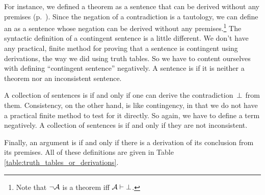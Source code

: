 For instance, we defined a theorem as a sentence that can be derived
without any premises (p.~\pageref{def:syntactic_tautology_in_sl}).
Since the negation of a contradiction is a tautology, we can define an
\label{def:syntactic_contradiction_in_sl} as a sentence whose negation
can be derived without any premises.\footnote{Note that $\lnot
\mathcal{A}$ is a theorem iff $\mathcal{A} \vdash \bot$.} The syntactic
definition of a contingent sentence is a little different. We don't
have any practical, finite method for proving that a sentence is
contingent using derivations, the way we did using truth tables. So we
have to content ourselves with defining ``contingent sentence''
negatively. A sentence is  \label{def:syntactically_contingent_in_sl} if it is neither a
theorem nor an inconsistent sentence.
 

A collection of sentences is  \label{def:syntactically_inconsistent_ in_sl} if and only if one can derive the contradiction~$\bot$ from them. Consistency, on the other hand, is like contingency, in that we do not have a practical finite method to test for it directly. So again, we have to define a term negatively. A collection of sentences is  \label{def:syntactically consistent in SL} if and only if they are not inconsistent.
    

Finally, an argument is  \label{def:syntactically_valid_in_SL} if and only if there is a derivation of its conclusion from its premises. All of these definitions are given in Table \ref{table:truth_tables_or_derivations}.

